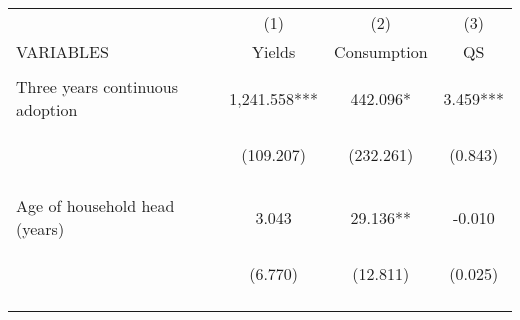 \begin{center}
\begin{tabular}{lccc} \hline
 & (1) & (2) & (3) \\
VARIABLES & Yields & Consumption & QS \\ \hline
\vspace{4pt} & \begin{footnotesize}\end{footnotesize} & \begin{footnotesize}\end{footnotesize} & \begin{footnotesize}\end{footnotesize} \\
Three years continuous adoption & 1,241.558*** & 442.096* & 3.459*** \\
 & \begin{footnotesize}(109.207)\end{footnotesize} & \begin{footnotesize}(232.261)\end{footnotesize} & \begin{footnotesize}(0.843)\end{footnotesize} \\
\vspace{4pt} & \begin{footnotesize}[0.000]\end{footnotesize} & \begin{footnotesize}[0.057]\end{footnotesize} & \begin{footnotesize}[0.000]\end{footnotesize} \\
Age of household head (years) & 3.043 & 29.136** & -0.010 \\
 & \begin{footnotesize}(6.770)\end{footnotesize} & \begin{footnotesize}(12.811)\end{footnotesize} & \begin{footnotesize}(0.025)\end{footnotesize} \\
\vspace{4pt} & \begin{footnotesize}[0.653]\end{footnotesize} & \begin{footnotesize}[0.023]\end{footnotesize} & \begin{footnotesize}[0.696]\end{footnotesize} \\

\end{tabular}
\end{center}
